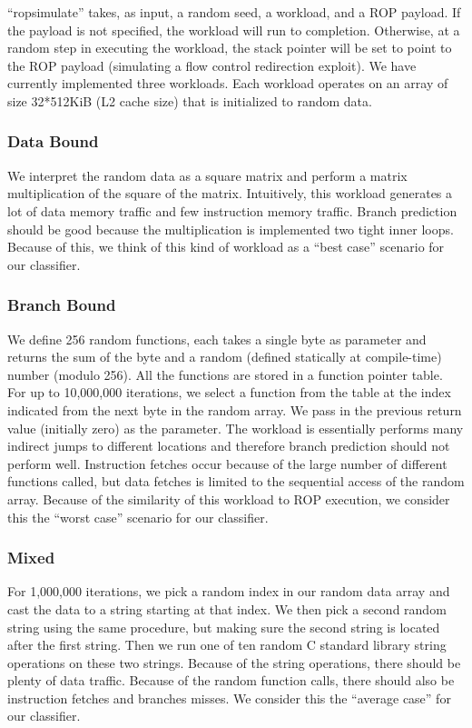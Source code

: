 \documentclass[letterpaper,twocolumn,10pt]{article}
\begin{document}
``ropsimulate'' takes, as input, a random seed, a workload, and a ROP payload. If the payload is not specified, the 
workload will run to completion. Otherwise, at a random step in executing the workload, the stack pointer will be 
set to point to the ROP payload (simulating a flow control redirection exploit). We have currently implemented three 
workloads. Each workload operates on an array of size 32*512KiB (L2 cache size) that is initialized to random data.

\subsubsection*{Data Bound}

We interpret the random data as a square matrix and perform a matrix multiplication of the square of the matrix. 
Intuitively, this workload generates a lot of data memory traffic and few instruction memory traffic. Branch prediction 
should be good because the multiplication is implemented two tight inner loops. Because of this, we think of this 
kind of workload as a ``best case'' scenario for our classifier.

\subsubsection*{Branch Bound}

We define 256 random functions, each takes a single byte as parameter and returns the sum of the byte and a random (defined 
statically at compile-time) number (modulo 256). All the functions are stored in a function pointer table. For up to 
10,000,000 iterations, we select a function from the table at the index indicated from the next byte in the random 
array. We pass in the previous return value (initially zero) as the parameter. The workload is essentially performs 
many indirect jumps to different locations and therefore branch prediction should not perform well. Instruction 
fetches occur because of the large number of different functions called, but data fetches is limited to the sequential 
access of the random array. Because of the similarity of this workload to ROP execution, we consider this the 
``worst case'' scenario for our classifier.

\subsubsection*{Mixed}

For 1,000,000 iterations, we pick a random index in our random data array and cast the data to a string starting at 
that index. We then pick a second random string using the same procedure, but making sure the second string is 
located after the first string. Then we run one of ten random C standard library string operations on these two 
strings. Because of the string operations, there should be plenty of data traffic. Because of the random function calls, 
there should also be instruction fetches and branches misses. We consider this the ``average case'' for our classifier.
\end{document}
